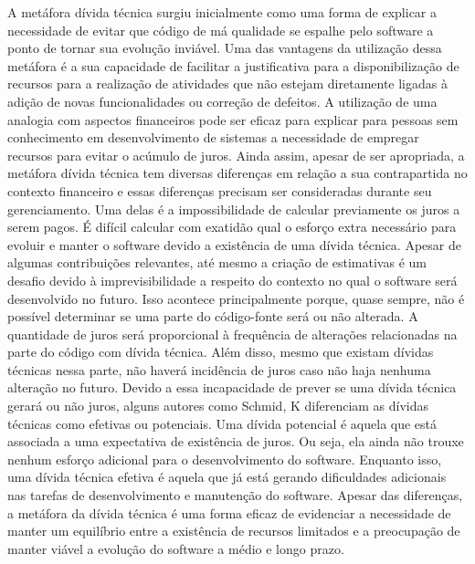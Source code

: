 A metáfora dívida técnica surgiu inicialmente como uma forma de explicar a necessidade de evitar que código de má qualidade se espalhe pelo software a ponto de tornar sua evolução inviável\cite{cunningham1993wycash}. Uma das vantagens da utilização dessa metáfora é a sua capacidade de facilitar a justificativa para a disponibilização de recursos para a realização de atividades que não estejam diretamente ligadas à adição de novas funcionalidades ou correção de defeitos.  A utilização de uma analogia com aspectos financeiros pode ser eficaz para explicar para pessoas sem conhecimento em desenvolvimento de sistemas a necessidade de empregar recursos para evitar o acúmulo de juros. Ainda assim,  apesar de ser apropriada, a metáfora dívida técnica tem diversas diferenças em relação a sua contrapartida no contexto financeiro e essas diferenças precisam ser consideradas durante seu gerenciamento. Uma delas é a impossibilidade de calcular previamente os juros a serem pagos. É difícil calcular com exatidão qual o esforço extra necessário para evoluir e manter o software devido a existência de uma dívida técnica. Apesar de algumas contribuições relevantes\cite{singh2014framework,seaman2011measuring,curtis2012estimating}, até mesmo a criação de estimativas é um desafio devido à imprevisibilidade a respeito do contexto no qual o software será desenvolvido no futuro. Isso acontece principalmente porque, quase sempre, não é possível determinar se uma parte do código-fonte será ou não alterada. A quantidade de juros será proporcional à frequência de alterações relacionadas na parte do código com dívida técnica. Além disso, mesmo que existam dívidas técnicas nessa parte, não haverá incidência de juros caso não haja nenhuma alteração no futuro. Devido a essa incapacidade de prever se uma dívida técnica gerará ou não juros, alguns autores como Schmid, K\cite{schmid2013limits} diferenciam as dívidas técnicas como efetivas ou potenciais. Uma dívida potencial é aquela que está associada a uma expectativa de  existência de juros. Ou seja, ela ainda não trouxe nenhum esforço adicional para o desenvolvimento do software. Enquanto isso, uma dívida técnica efetiva é aquela que já está gerando dificuldades adicionais nas tarefas de desenvolvimento e manutenção do software. Apesar das diferenças, a metáfora da dívida técnica é uma forma eficaz de evidenciar a necessidade de manter um equilíbrio entre a existência de recursos limitados e a preocupação de manter viável a evolução do software a médio e longo prazo.



